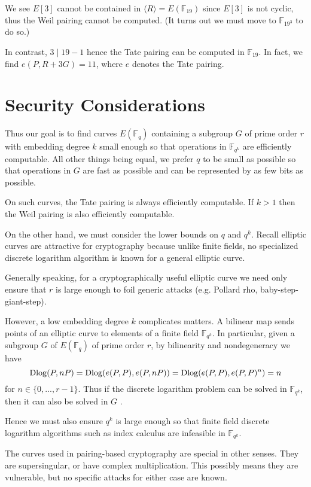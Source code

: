 We see $E[3]$ cannot be contained in $\langle R \rangle = E(\mathbb{F}_{19})$
since $E[3]$ is not cyclic, thus the Weil pairing cannot be computed.
(It turns out we must move to $\mathbb{F}_{19^3}$ to do so.)

In contrast, $3 \mid 19-1$ hence the Tate pairing can be
computed in $\mathbb{F}_{19}$. In fact, we find $e(P, R + 3G) = 11$, where
$e$ denotes the Tate pairing.

\section {Security Considerations}

Thus our goal is to find curves $E(\mathbb{F}_q)$ containing a subgroup
$G$ of prime order $r$ with embedding degree $k$ small enough so that
operations in $\mathbb{F}_{q^k}$ are efficiently computable.
All other things being equal, we prefer $q$ to be small as possible so
that operations in $G$ are fast as possible and can be represented by
as few bits as possible.

On such curves, the Tate pairing is always efficiently computable.
If $k > 1$ then the Weil pairing is also efficiently computable.

On the other hand, we must consider the lower bounds on $q$ and $q^k$.
Recall elliptic curves are attractive for cryptography
because unlike finite fields,
no specialized discrete logarithm algorithm is known for a general elliptic
curve.

Generally speaking, for a cryptographically useful elliptic curve
we need only ensure that $r$ is large enough to foil generic attacks
(e.g. Pollard rho, baby-step-giant-step).

However, a low embedding degree $k$ complicates matters. A bilinear map
sends points of an elliptic curve to elements of a finite field
$\mathbb{F}_{q^k}$. In particular, given a subgroup $G$ of $E(\mathbb{F}_q)$
of prime order $r$, by bilinearity and nondegeneracy we have
\[ \mathop{\rm Dlog} (P, nP) = \mathop{\rm Dlog} ( e(P,P), e(P, nP) )
= \mathop{\rm Dlog} (e(P,P),e(P,P)^n) = n \]
for $n \in \{0,...,r-1\}$.
Thus if the discrete logarithm problem can be solved
in $\mathbb{F}_{q^k}$, then it can also be solved in $G$ \cite{mov,fr}.

Hence we must also ensure $q^k$ is large enough so that
finite field discrete logarithm algorithms such as index calculus are
infeasible in $\mathbb{F}_{q^k}$.

The curves used in pairing-based cryptography are special in other senses.
They are supersingular, or have complex multiplication. This possibly means
they are vulnerable, but no specific attacks for either case are known.

